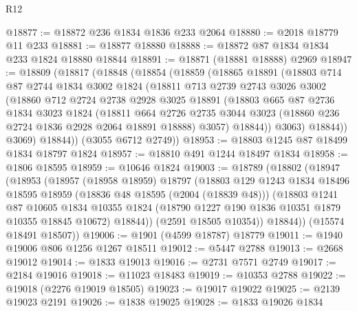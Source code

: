 \begin{lexlean}{R12}
\begin{coremodule}
@18877 := @18872 @236 @1834 @1836 @233 @2064
@18880 := @2018 @18779 @11 @233
@18881 := @18877 @18880
@18888 := @18872 @87 @1834 @1834 @233 @1824 @18880 @18844
@18891 := @18871 (@18881 @18888) @2969
@18947 := @18809
    (@18817
      (@18848
        (@18854
          (@18859
            (@18865
              @18891
              (@18803
                @714
                @87
                @2744
                @1834
                @3002
                @1824
                (@18811
                  @713
                  @2739
                  @2743
                  @3026
                  @3002
                  (@18860
                    @712
                    @2724
                    @2738
                    @2928
                    @3025
                    @18891
                    (@18803
                      @665
                      @87
                      @2736
                      @1834
                      @3023
                      @1824
                      (@18811
                        @664
                        @2726
                        @2735
                        @3044
                        @3023
                        (@18860 @236 @2724 @1836 @2928 @2064 @18891 @18888)
                        @3057)
                      @18844))
                  @3063)
                @18844))
            @3069)
          @18844))
      (@3055 @6712 @2749))
@18953 := @18803 @1245 @87 @18499 @1834 @18797 @1824
@18957 := @18810 @491 @1244 @18497 @1834
@18958 := @1806 @18595
@18959 := @10646 @1824
@19003 := @18789
    (@18802
      (@18947
        (@18953
          (@18957
            (@18958 @18959)
            @18797
            (@18803
              @129
              @1243
              @1834
              @18496
              @18595
              @18959
              (@18836 @48 @18595 (@2004 (@18839 @48)))
              (@18803
                @1241
                @87
                @10605
                @1834
                @10355
                @1824
                (@18790 @1227 @190 @1836 @10351 @1879 @10355 @18845 @10672)
                @18844))
            (@2591 @18505 @10354))
          @18844))
      (@15574 @18491 @18507))
@19006 := @1901 (@4599 @18787) @18779
@19011 := @1940 @19006 @806 @1256 @1267 @18511
@19012 := @5447 @2788
@19013 := @2668 @19012
@19014 := @1833 @19013
@19016 := @2731 @7571 @2749
@19017 := @2184 @19016
@19018 := @11023 @18483
@19019 := @10353 @2788
@19022 := @19018 (@2276 @19019 @18505)
@19023 := @19017 @19022
@19025 := @2139 @19023 @2191
@19026 := @1838 @19025
@19028 := @1833 @19026 @1834

\end{coremodule}
\end{lexlean}
